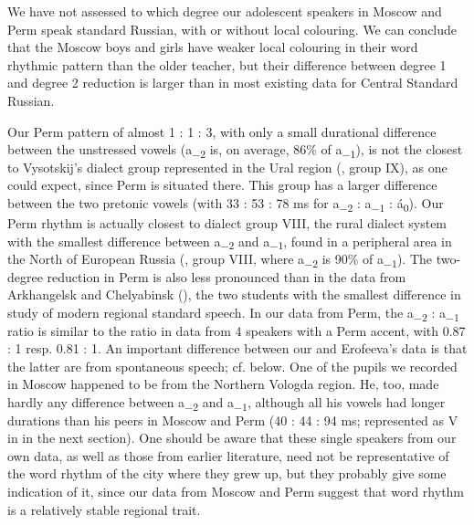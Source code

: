 \documentclass[output=paper]{langscibook}
\begin{document}
We have not assessed to which degree our adolescent speakers in Moscow and Perm speak standard Russian, with or without local colouring. We can conclude that the Moscow boys and girls have weaker local colouring in their word rhythmic pattern than the older teacher, but their difference between degree 1 and degree 2 reduction is larger than in most existing data for Central Standard Russian. 



Our Perm pattern of almost 1 : 1 : 3, with only a small durational difference between the unstressed vowels (a\textsubscript{$-2$} is, on average, 86\% of a\textsubscript{$-1$}), is not the closest to Vysotskij’s dialect group represented in the Ural region (, group IX), as one could expect, since Perm is situated there. This group has a larger difference between the two pretonic vowels (with 33 : 53 : 78 ms for a\textsubscript{$-2$} : a\textsubscript{$-1$} : á\textsubscript{0}). Our Perm rhythm is actually closest to dialect group VIII, the rural dialect system with the smallest difference between a\textsubscript{$-2$} and a\textsubscript{$-1$}, found in a peripheral area in the North of European Russia (, group VIII, where a\textsubscript{$-2$} is 90\% of a\textsubscript{$-1$}). The two-degree reduction in Perm is also less pronounced than in the data from Arkhangelsk and Chelyabinsk (), the two students with the smallest difference in  study of modern regional standard speech. In our data from Perm, the a\textsubscript{$-2$} : a\textsubscript{$-1$} ratio is similar to the ratio in  data from 4 speakers with a Perm accent, with 0.87 : 1 resp. 0.81 : 1. An important difference between our and Erofeeva’s data is that the latter are from spontaneous speech; cf.  below. One of the pupils we recorded in Moscow happened to be from the Northern Vologda region. He, too, made hardly any difference between a\textsubscript{$-2$} and a\textsubscript{$-1$}, although all his vowels had longer durations than his peers in Moscow and Perm (40 : 44 : 94 ms; represented as V in  in the next section). One should be aware that these single speakers from our own data, as well as those from earlier literature, need not be representative of the word rhythm of the city where they grew up, but they probably give some indication of it, since our data from Moscow and Perm suggest that word rhythm is a relatively stable regional trait.
\end{document}
